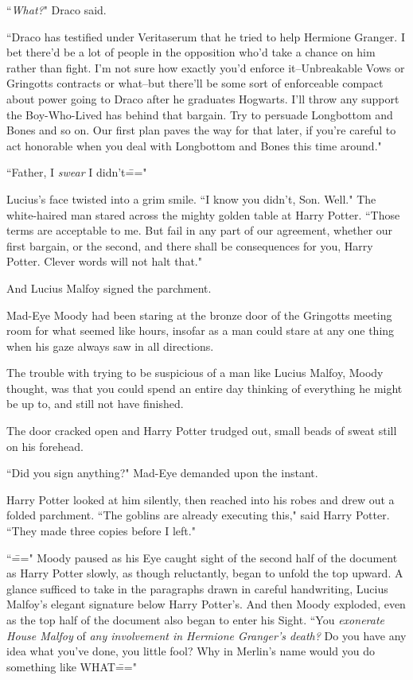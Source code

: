 ``\emph{What?}" Draco said.

``Draco has testified under Veritaserum that he tried to help Hermione Granger. I bet there'd be a lot of people in the opposition who'd take a chance on him rather than fight. I'm not sure how exactly you'd enforce it\---Unbreakable Vows or Gringotts contracts or what\---but there'll be some sort of enforceable compact about power going to Draco after he graduates Hogwarts. I'll throw any support the Boy-Who-Lived has behind that bargain. Try to persuade Longbottom and Bones and so on. Our first plan paves the way for that later, if you're careful to act honorable when you deal with Longbottom and Bones this time around."

``Father, I \emph{swear} I didn't\==="

Lucius's face twisted into a grim smile. ``I know you didn't, Son. Well." The white-haired man stared across the mighty golden table at Harry Potter. ``Those terms are acceptable to me. But fail in any part of our agreement, whether our first bargain, or the second, and there shall be consequences for you, Harry Potter. Clever words will not halt that."

And Lucius Malfoy signed the parchment.

\later

Mad-Eye Moody had been staring at the bronze door of the Gringotts meeting room for what seemed like hours, insofar as a man could stare at any one thing when his gaze always saw in all directions.

The trouble with trying to be suspicious of a man like Lucius Malfoy, Moody thought, was that you could spend an entire day thinking of everything he might be up to, and still not have finished.

The door cracked open and Harry Potter trudged out, small beads of sweat still on his forehead.

``Did you sign anything?" Mad-Eye demanded upon the instant.

Harry Potter looked at him silently, then reached into his robes and drew out a folded parchment. ``The goblins are already executing this," said Harry Potter. ``They made three copies before I left."

``\===" Moody paused as his Eye caught sight of the second half of the document as Harry Potter slowly, as though reluctantly, began to unfold the top upward. A glance sufficed to take in the paragraphs drawn in careful handwriting, Lucius Malfoy's elegant signature below Harry Potter's. And then Moody exploded, even as the top half of the document also began to enter his Sight. ``You \emph{exonerate House Malfoy} of \emph{any involvement in Hermione Granger's death?} Do you have any idea what you've done, you little fool? Why in Merlin's name would you do something like WHAT\==="

